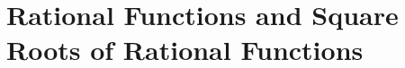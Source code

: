 \documentclass[../multivariate_calculus.tex]{subfiles}
\begin{document}

    \section{Rational Functions and Square Roots of Rational Functions}
\end{document}
